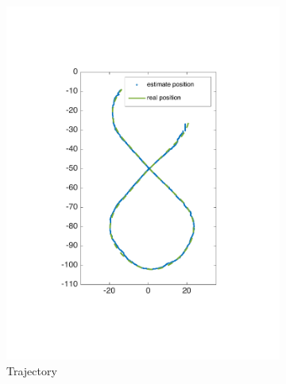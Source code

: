\begin{figure}[!htbp]
  \centering
  \begin{subfigure}[b]{0.5\textwidth}
        \includegraphics[width=\textwidth]{img/high_altitude_error_xy.pdf}
        \caption{Trajectory}
        \label{fig:one}
   \end{subfigure} \\
   \begin{subfigure}[b]{0.45\textwidth}

\end{subfigure}
\end{figure}
